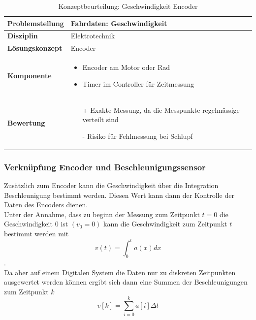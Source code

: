 \documentclass[../../main.tex]{subfiles}
\begin{document}
    \begin{flushleft}
        \begin{table}[H]
        \begin{tabular}{ | l | p{11cm} |}
        \hline
        \textbf{Problemstellung} & Fahrdaten: Geschwindigkeit \\ \hline
        \textbf{Disziplin} & Elektrotechnik \\ \hline
        \textbf{Lösungskonzept} & Encoder\\ \hline
        \textbf{Komponente} & \begin{itemize}
            \item Encoder am Motor oder Rad
            \item Timer im Controller für Zeitmessung
            \end{itemize}\\ \hline
        \textbf{Bewertung} &  \begin{itemize}
                                \item[+] Exakte Messung, da die Messpunkte regelmässige verteilt sind
                                \item[-] Risiko für Fehlmessung bei Schlupf
                              \end{itemize} \\ \hline
        \end{tabular}
        \caption{Konzeptbeurteilung: Geschwindigkeit Encoder}
        \label{tab:fahr_Encoder}
    \end{table}
    \end{flushleft}

    \subsubsection{Verknüpfung Encoder und Beschleunigungssensor}
    Zusätzlich zum Encoder kann die Geschwindigkeit über die Integration Beschleunigung bestimmt werden. Diesen Wert kann dann der Kontrolle der Daten des Encoders dienen.\\
    Unter der Annahme, dass zu beginn der Messung zum Zeitpunkt $t = 0$ die Geschwindigkeit $0$ ist $(v_0 = 0)$ kann die Geschwindigkeit zum Zeitpunkt $t$ bestimmt werden mit $$v(t) = \int_{0}^{t} a(x) dx$$.\\
    Da aber auf einem Digitalen System die Daten nur zu diskreten Zeitpunkten ausgewertet werden können ergibt sich dann eine Summen der Beschleunigungen zum Zeitpunkt $k$ $$v[k] = \sum_{i=0}^{k}a[i] \Delta t$$ 
\end{document}
